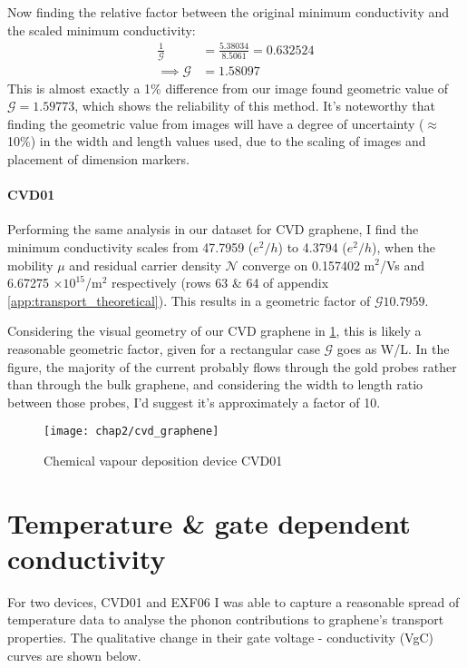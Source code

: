 \documentclass[../Matt_Gebert_Honours_Thesis.tex]{subfiles}
\begin{document}
	Now finding the relative factor between the original minimum conductivity and the scaled minimum conductivity:
	\begin{align}
		\frac{1}{\mathcal{G}} &= \frac{5.38034}{8.5061} = 0.632524\\
		\implies \mathcal{G} &= 1.58097
	\end{align}
	This is almost exactly a 1\% difference from our image found geometric value of $\mathcal{G} = 1.59773$, which shows the reliability of this method. 
	It's noteworthy that finding the geometric value from images will have a degree of uncertainty ($\approx$10\%) in the width and length values used, due to the scaling of images and placement of dimension markers.

	\paragraph{CVD01}
	Performing the same analysis in our dataset for CVD graphene, I find the minimum conductivity scales from 47.7959 ($e^2/h$) to 4.3794 ($e^2/h$), when the mobility $\mu$ and residual carrier density $\mathcal{N}$ converge on 0.157402 m$^2$/Vs and 6.67275 $\times10^{15}$/m$^2$ respectively (rows 63 \& 64 of appendix \ref{app:transport_theoretical}). This results in a geometric factor of $\mathcal{G} 10.7959$.

	Considering the visual geometry of our CVD graphene in \cref{fig:cvd_sample}, this is likely a reasonable geometric factor, given for a rectangular case $\mathcal{G}$ goes as W/L. In the figure, the majority of the current probably flows through the gold probes rather than through the bulk graphene, and considering the width to length ratio between those probes, I'd suggest it's approximately a factor of 10.
	\begin{figure}[H]
		\centering
		\texttt{[image: chap2/cvd\_graphene]}
		\caption[Device CVD01]{Chemical vapour deposition device CVD01}\label{fig:cvd_sample}
	\end{figure}

\section{Temperature \& gate dependent conductivity}
For two devices, CVD01 and EXF06 I was able to capture a reasonable spread of temperature data to analyse the phonon contributions to graphene's transport properties. The qualitative change in their gate voltage - conductivity (VgC) curves are shown below.
\end{document}
